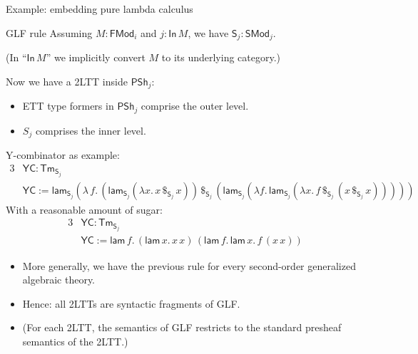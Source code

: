 \documentclass[dvipsnames,aspectratio=169]{beamer}
\newcommand{\ms}[1]{\mathsf{#1}}
\newcommand{\Tm}{\mathsf{Tm}}
\newcommand{\In}{\mathsf{In}}
\newcommand{\PSh}{\mathsf{PSh}}
\newcommand{\SMod}{\mathsf{SMod}}
\newcommand{\FMod}{\mathsf{FMod}}
\renewcommand{\S}{\mathsf{S}}
\newcommand{\lam}{\ms{lam}}
\begin{document}
\begin{frame}{Example: embedding pure lambda calculus}

\begin{block}{GLF rule}
  Assuming $M : \FMod_i$ and $j : \In\,M$, we have $\S_j : \SMod_j$.

  {\footnotesize (In ``$\In\,M$'' we implicitly convert $M$ to its underlying category.)}
\end{block}
\vspace{0.5em}

Now we have a 2LTT inside $\PSh_j$:
\begin{itemize}
\item ETT type formers in $\PSh_j$ comprise the outer level.
\item $S_j$ comprises the inner level.
\end{itemize}
\vspace{0.5em}
\pause
Y-combinator as example:
\begin{alignat*}{3}
  & \ms{YC} : \Tm_{\S_j} \\
  & \ms{YC} := \lam_{\S_j}(\lambda\,f.\,(\lam_{\S_j} (\lambda x.\, x\,\$_{\S_j}\,x))\,\$_{\S_j}\,
               (\lam_{\S_j} (\lambda f.\,\lam_{\S_j} (\lambda x.\, f \,\$_{\S_j}\, (x \,\$_{\S_j}\, x)))))
\end{alignat*}
\pause
With a reasonable amount of sugar:
\begin{alignat*}{3}
  & \ms{YC} : \Tm_{\S_j} \\
  & \ms{YC} := \lam\,f.\,(\lam\,x.\,x\,x)\,(\lam\,f.\,\lam\,x.\,f\,(x\,x))
\end{alignat*}

\end{frame}

\begin{frame}{}

\begin{itemize}
\item More generally, we have the previous rule for every second-order generalized algebraic theory.
\item Hence: all 2LTTs are syntactic fragments of GLF.
\item (For each 2LTT, the semantics of GLF restricts to the standard presheaf semantics of the 2LTT.)
\end{itemize}


\end{frame}
\end{document}
